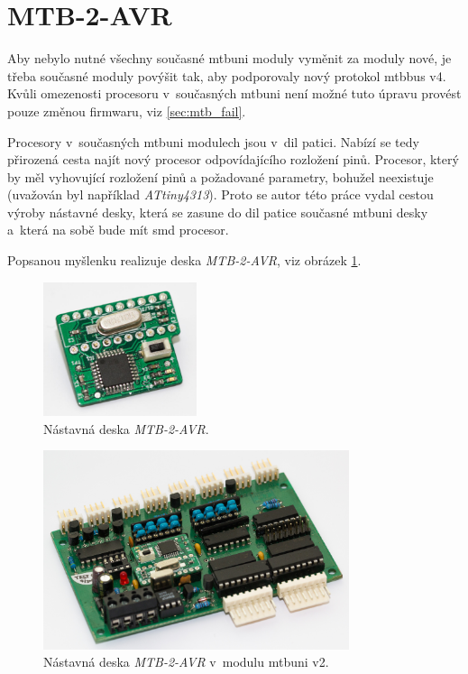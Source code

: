 \newpage
\section{MTB-2-AVR} \label{sec:mtb-2-avr}

Aby nebylo nutné všechny současné \gls{mtbuni} moduly vyměnit za moduly nové,
je třeba současné moduly povýšit tak, aby podporovaly nový protokol \gls{mtbbus} v4.
Kvůli omezenosti procesoru v~současných \gls{mtbuni} není možné tuto
úpravu provést pouze změnou firmwaru, viz \ref{sec:mtb_fail}.

Procesory v~současných \gls{mtbuni} modulech jsou
v~\gls{dil} patici. Nabízí se tedy přirozená cesta najít nový procesor
odpovídajícího rozložení pinů. Procesor, který by měl vyhovující rozložení pinů
a požadované parametry, bohužel neexistuje (uvažován byl například
\textit{ATtiny4313}). Proto se autor této práce vydal cestou výroby nástavné
desky, která se zasune do \gls{dil} patice současné \gls{mtbuni} desky
a~která na sobě bude mít \gls{smd} procesor.

Popsanou myšlenku realizuje deska \textit{MTB-2-AVR}, viz obrázek
\ref{fig:mtb-2-avr-alone}.

\begin{figure}[ht]
\includegraphics[width=0.4\textwidth]{data/uni-2-upgrade-alone.jpg}
\caption{Nástavná deska \textit{MTB-2-AVR}.}
\label{fig:mtb-2-avr-alone}
\end{figure}

\begin{figure}[ht]
\includegraphics[width=0.8\textwidth]{data/uni-2-upgrade-all.jpg}
\caption{Nástavná deska \textit{MTB-2-AVR} v~modulu \gls{mtbuni} v2.}
\label{fig:mtb-2-avr-inside}
\end{figure}

